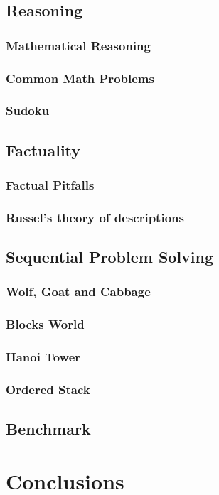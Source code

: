 \documentclass[12pt]{article}
\begin{document}
\subsection{Reasoning}
\subsubsection{Mathematical Reasoning}
\subsubsection{Common Math Problems}
\subsubsection{Sudoku}
\subsection{Factuality}
\subsubsection{Factual Pitfalls}
\subsubsection{Russel’s theory of descriptions}
\subsection{Sequential Problem Solving}
\subsubsection{Wolf, Goat and Cabbage}
\subsubsection{Blocks World}
\subsubsection{Hanoi Tower}
\subsubsection{Ordered Stack}
\subsection{Benchmark}

\clearpage
\section{Conclusions}

\clearpage
\printbibliography
\clearpage
\end{document}
